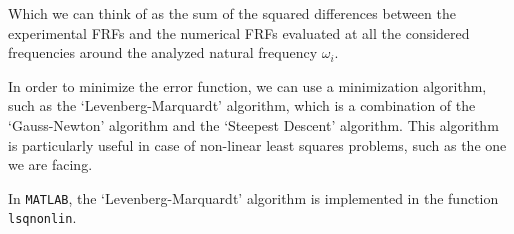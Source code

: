 Which we can think of as the sum of the squared differences between the experimental FRFs and the numerical FRFs evaluated at all the considered frequencies around the analyzed natural frequency $\omega_i$.

In order to minimize the error function, we can use a minimization algorithm, such as the `Levenberg-Marquardt' algorithm, which is a combination of the `Gauss-Newton' algorithm and the `Steepest Descent' algorithm.
This algorithm is particularly useful in case of non-linear least squares problems, such as the one we are facing.

In \texttt{MATLAB}, the `Levenberg-Marquardt' algorithm is implemented in the function \texttt{lsqnonlin}.
